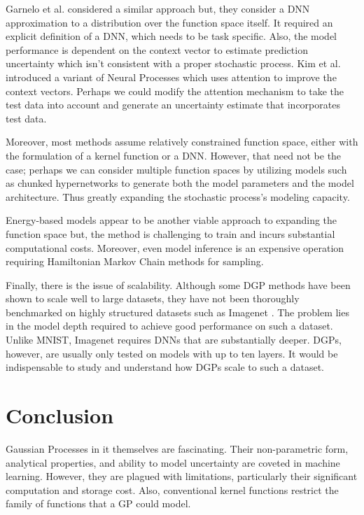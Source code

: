 \documentclass[letterpaper,11pt]{extarticle}
\begin{document}
Garnelo et al. \cite{GarneloSRVRET18} considered a similar approach but, they consider a DNN approximation to a distribution over the function space itself. It required an explicit definition of a DNN, which needs to be task specific. Also, the model performance is dependent on the context vector to estimate prediction uncertainty which isn't consistent with a proper stochastic process. Kim et al. \cite{KimMSGERVT18} introduced a variant of Neural Processes which uses attention to improve the context vectors. Perhaps we could modify the attention mechanism to take the test data into account and generate an uncertainty estimate that incorporates test data.

Moreover, most methods assume relatively constrained function space, either with the formulation of a kernel function or a DNN. However, that need not be the case; perhaps we can consider multiple function spaces by utilizing models such as chunked hypernetworks \cite{OswaldHSG20} to generate both the model parameters and the model architecture. Thus greatly expanding the stochastic process's modeling capacity. 

Energy-based models appear to be another viable approach to expanding the function space but, the method is challenging to train and incurs substantial computational costs. Moreover, even model inference is an expensive operation requiring Hamiltonian Markov Chain methods for sampling. 

Finally, there is the issue of scalability. Although some DGP methods have been shown to scale well to large datasets, they have not been thoroughly benchmarked on highly structured datasets such as Imagenet \cite{DengDSLLF09}. The problem lies in the model depth required to achieve good performance on such a dataset. Unlike MNIST, Imagenet requires DNNs that are substantially deeper. DGPs, however, are usually only tested on models with up to ten layers. It would be indispensable to study and understand how DGPs scale to such a dataset. 
 
\section{Conclusion}
Gaussian Processes in it themselves are fascinating. Their non-parametric form, analytical properties, and ability to model uncertainty are coveted in machine learning. However, they are plagued with limitations, particularly their significant computation and storage cost. Also, conventional kernel functions restrict the family of functions that a GP could model. 
\end{document}
